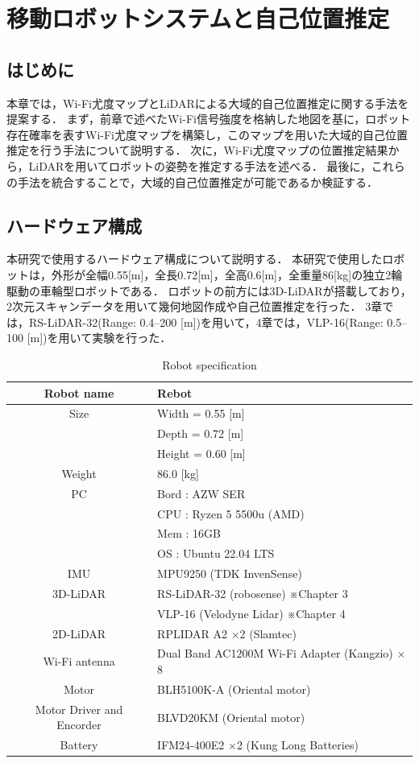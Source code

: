 \chapter{移動ロボットシステムと自己位置推定}
\graphicspath{{figures/03}}
\section{はじめに}
本章では，Wi-Fi尤度マップとLiDARによる大域的自己位置推定に関する手法を提案する．
まず，前章で述べたWi-Fi信号強度を格納した地図を基に，ロボット存在確率を表すWi-Fi尤度マップを構築し，このマップを用いた大域的自己位置推定を行う手法について説明する．
次に，Wi-Fi尤度マップの位置推定結果から，LiDARを用いてロボットの姿勢を推定する手法を述べる．
最後に，これらの手法を統合することで，大域的自己位置推定が可能であるか検証する．


\section{ハードウェア構成}
本研究で使用するハードウェア構成について説明する．
本研究で使用したロボットは，外形が全幅0.55[m]，全長0.72[m]，全高0.6[m]，全重量86[kg]の独立2輪駆動の車輪型ロボットである．
ロボットの前方には3D-LiDARが搭載しており，2次元スキャンデータを用いて幾何地図作成や自己位置推定を行った．
3章では，RS-LiDAR-32(Range: 0.4–200 [m])を用いて，4章では，VLP-16(Range: 0.5–100 [m])を用いて実験を行った．

\begin{table}[h]
 \begin{center}
 \caption{Robot specification}
  \begin{tabular}{|c||l|} \hline
    Robot name & Rebot \\ \hline \hline
    Size & Width = 0.55 [m] \\
    & Depth = 0.72 [m] \\
    &Height = 0.60 [m] \\ \hline
    Weight & 86.0 [kg] \\ \hline
    PC & Bord : AZW SER \\ 
     & CPU : Ryzen 5 5500u (AMD) \\
     & Mem : 16GB \\
     & OS : Ubuntu 22.04 LTS \\ \hline
    IMU & MPU9250 (TDK InvenSense) \\ \hline
    3D-LiDAR & RS-LiDAR-32 (robosense) ※Chapter 3 \\
             & VLP-16 (Velodyne Lidar) ※Chapter 4\\ \hline
    2D-LiDAR & RPLIDAR A2 $\times$2 (Slamtec) \\ \hline
    Wi-Fi antenna & Dual Band AC1200M Wi-Fi Adapter (Kangzio) $\times$8 \\ \hline
    Motor & BLH5100K-A (Oriental motor) \\ \hline
    Motor Driver and Encorder & BLVD20KM (Oriental motor) \\ \hline
    Battery & IFM24-400E2 $\times$2 (Kung Long Batteries) \\  \hline
   \end{tabular}
  \label{tab:spec_nict}
 \end{center}
\end{table}
